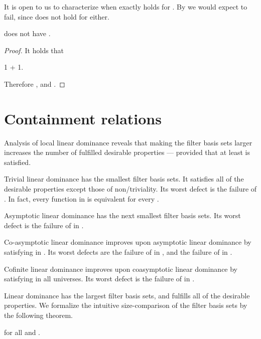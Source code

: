 \documentclass[b5paper, english, oneside]{memoir}
\begin{document}
\begin{note}
It is open to us to characterize when exactly  holds for . By  we would expect  to fail, since  does not hold for  either.
\end{note}

\begin{theorem}
\label{ZeroTrivialityFailsForAffineDominance}
 does not have .
\end{theorem}

\begin{proof}
It holds that
\begin{eqs}
1   + 1.
\end{eqs}
Therefore , and .
\end{proof}

\section{Containment relations}

Analysis of local linear dominance reveals that making the filter basis sets larger increases the number of fulfilled desirable properties --- provided that at least  is satisfied. 

Trivial linear dominance has the smallest filter basis sets. It satisfies all of the desirable properties except those of non\-/triviality. Its worst defect is the failure of . In fact, every function in  is equivalent for every . 

Asymptotic linear dominance has the next smallest filter basis sets. Its worst defect is the failure of  in . 

Co-asymptotic linear dominance improves upon asymptotic linear dominance by satisfying  in . Its worst defects are the failure of  in , and the failure of  in . 

Cofinite linear dominance improves upon coasymptotic linear dominance by satisfying  in all universes. Its worst defect is the failure of  in .

Linear dominance has the largest filter basis sets, and fulfills all of the desirable properties. We formalize the intuitive size-comparison of the filter basis sets by the following theorem.

\begin{theorem}[Containment in ]
\label{Containment}

for all  and .
\end{theorem}
\end{document}

